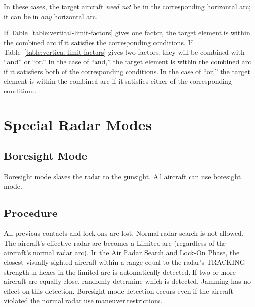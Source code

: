 \begin{advancedrules}
{\begin{itemize}
                In these cases, the target aircraft \emph{need not} be in the corresponding horizontal arc; it can be in \emph{any} horizontal arc.

        \end{itemize}

        If Table~\ref{table:vertical-limit-factors} gives one factor, the target element is within the combined arc if it satisfies the corresponding conditions. If Table~\ref{table:vertical-limit-factors} gives two factors, they will be combined with “and” or “or.” In the case of “and,” the target element is within the combined arc if it satisfiers both of the corresponding conditions. In the case of “or,” the target element is within the combined arc if it satisfies either of the corresponding conditions.
    }

    \section{Special Radar Modes}
    \label{rule:special-radar-modes}

    \subsection{Boresight Mode}\label{rule:boresight-mode} Boresight mode slaves the radar to the gunsight. All aircraft can use boresight mode.  

    \subsection{Procedure}  All previous contacts and lock-ons are lost. Normal radar search is not allowed. The aircraft's effective radar arc becomes a Limited arc (regardless of the aircraft's normal radar arc). In the Air Radar Search and Lock-On Phase, the closest visually sighted aircraft within a range equal to the radar's TRACKING strength in hexes in the limited arc is automatically detected. If two or more aircraft are equally close, randomly determine which is detected. Jamming has no effect on this detection. Boresight mode detection occurs even if the aircraft violated the normal radar use maneuver restrictions.


\end{advancedrules}
